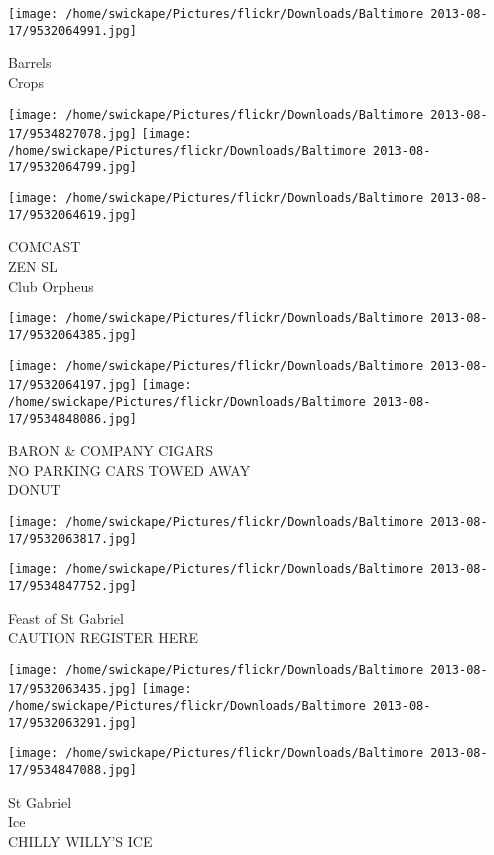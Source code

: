 \documentclass[10pt,letterpaper]{article}
\begin{document}
\vspace{0.25in}
\texttt{[image: /home/swickape/Pictures/flickr/Downloads/Baltimore 2013-08-17/9532064991.jpg]}

Barrels\\
Crops
\pagebreak

\texttt{[image: /home/swickape/Pictures/flickr/Downloads/Baltimore 2013-08-17/9534827078.jpg]}
\texttt{[image: /home/swickape/Pictures/flickr/Downloads/Baltimore 2013-08-17/9532064799.jpg]}

\texttt{[image: /home/swickape/Pictures/flickr/Downloads/Baltimore 2013-08-17/9532064619.jpg]}

COMCAST\\
ZEN SL\\
Club Orpheus
\pagebreak

\texttt{[image: /home/swickape/Pictures/flickr/Downloads/Baltimore 2013-08-17/9532064385.jpg]}

\vspace{0.25in}
\texttt{[image: /home/swickape/Pictures/flickr/Downloads/Baltimore 2013-08-17/9532064197.jpg]}
\texttt{[image: /home/swickape/Pictures/flickr/Downloads/Baltimore 2013-08-17/9534848086.jpg]}

BARON \& COMPANY CIGARS\\
NO PARKING CARS TOWED AWAY\\
DONUT
\pagebreak

\texttt{[image: /home/swickape/Pictures/flickr/Downloads/Baltimore 2013-08-17/9532063817.jpg]}

\vspace{0.25in}
\texttt{[image: /home/swickape/Pictures/flickr/Downloads/Baltimore 2013-08-17/9534847752.jpg]}

Feast of St Gabriel\\
CAUTION REGISTER HERE
\pagebreak

\texttt{[image: /home/swickape/Pictures/flickr/Downloads/Baltimore 2013-08-17/9532063435.jpg]}
\texttt{[image: /home/swickape/Pictures/flickr/Downloads/Baltimore 2013-08-17/9532063291.jpg]}

\texttt{[image: /home/swickape/Pictures/flickr/Downloads/Baltimore 2013-08-17/9534847088.jpg]}

St Gabriel\\
Ice\\
CHILLY WILLY'S ICE
\pagebreak
\end{document}
